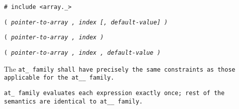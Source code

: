 
\tt{# include <array._>}

\s\s\s\tt{(} \it{pointer-to-array} \tt{,}
\it{index} [\tt{,} \it{default-value}] \tt{)}

\s\tt{(} \it{pointer-to-array} \tt{,}
\it{index} \tt{)}

\s\tt{(} \it{pointer-to-array} \tt{,}
\it{index} \phantom{[}\tt{,} \it{default-value}\phantom{]} \tt{)}


The \tt{at_} family shall have precisely the same
constraints as those applicable for the \tt{at__} family.


\tt{at_} family evaluates each expression exactly once;
rest of the semantics are identical to  \tt{at__} family.
